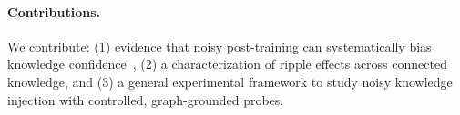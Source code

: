\paragraph{Contributions.} We contribute: (1) evidence that noisy post-training can systematically bias knowledge confidence~, (2) a characterization of ripple effects across connected knowledge, and (3) a general experimental framework to study noisy knowledge injection with controlled, graph-grounded probes.